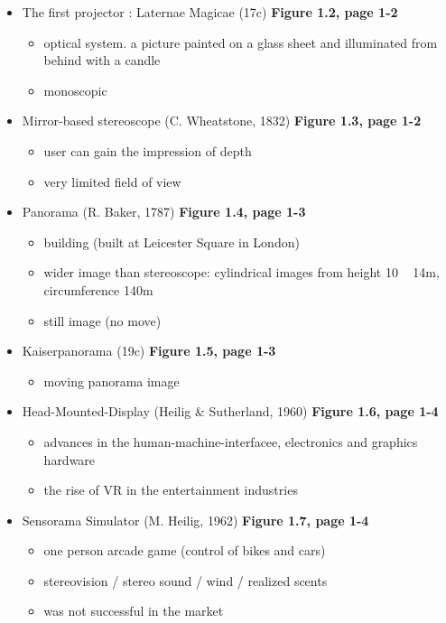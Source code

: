 \documentclass[12pt]{article}
\begin{document}
\begin{itemize}
	\item The first projector : Laternae Magicae (17c) \textbf{Figure 1.2, page 1-2}
		\begin{itemize}
			\item optical system. a picture painted on a glass sheet and illuminated from behind with a candle
			\item monoscopic 
		\end{itemize}
	\item Mirror-based stereoscope (C. Wheatstone, 1832) \textbf{Figure 1.3, page 1-2}
		\begin{itemize}
			\item user can gain the impression of depth 
			\item very limited field of view
		\end{itemize}
	\item Panorama (R. Baker, 1787) \textbf{Figure 1.4, page 1-3}
		\begin{itemize}
			\item building (built at Leicester Square in London)  
			\item wider image than stereoscope: cylindrical images from height 10 ~ 14m, circumference 140m
			\item still image (no move)
		\end{itemize}
	\item Kaiserpanorama (19c) \textbf{Figure 1.5, page 1-3}
		\begin{itemize}
			\item moving panorama image
		\end{itemize}
	\item Head-Mounted-Display (Heilig \& Sutherland, 1960) \textbf{Figure 1.6, page 1-4}
		\begin{itemize}
			\item advances in the human-machine-interfacee, electronics and graphics hardware
			\item the rise of VR in the entertainment industries
		\end{itemize}
	\item Sensorama Simulator (M. Heilig, 1962) \textbf{Figure 1.7, page 1-4}
		\begin{itemize}
			\item one person arcade game (control of bikes and cars)
			\item stereovision / stereo sound / wind / realized scents 
			\item was not successful in the market

\end{itemize}
\end{itemize}
\end{document}
